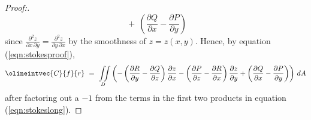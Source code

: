 \begin{proof}[Proof:]
\begin{equation}
   ~+~ \left( \frac{\partial Q}{\partial x} - \frac{\partial P}{\partial y} \right)
 \end{equation}
 since $\frac{\partial^2 z}{\partial x \, \partial y} = \frac{\partial^2 z}{\partial y \, \partial x}$ by the
 smoothness of $z=z(x,y)$. Hence, by equation (\ref{eqn:stokesproof}),
 \begin{equation}\label{eqn:stokespart1}
  \olineintvec{C}{f}{r} ~=~ \iint\limits_{D} \left(
   -\left( \frac{\partial R}{\partial y} - \frac{\partial Q}{\partial z} \right) \frac{\partial z}{\partial x}
   -\left( \frac{\partial P}{\partial z} - \frac{\partial R}{\partial x} \right) \frac{\partial z}{\partial y}
   + \left( \frac{\partial Q}{\partial x} - \frac{\partial P}{\partial y} \right) \right)\,dA
 \end{equation}
 after factoring out a $-1$ from the terms in the first two products in equation (\ref{eqn:stokeslong}).
 

\end{proof}
